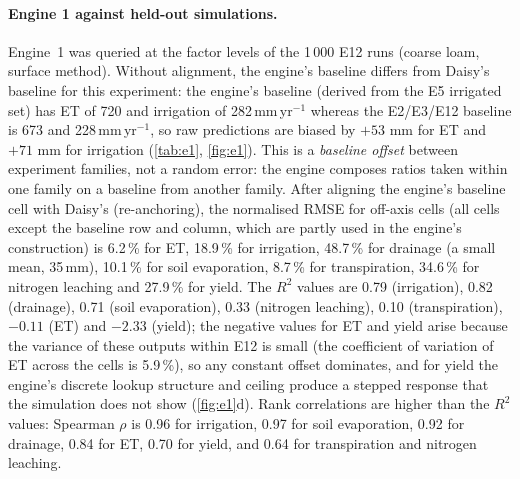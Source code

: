 \documentclass[preprint,12pt]{elsarticle}
\begin{document}
\paragraph{Engine 1 against held-out simulations.}
\label{sec:e1}
Engine~1 was queried at the factor levels of the 1\,000 E12 runs (coarse loam, surface method). Without alignment, the engine's baseline differs from Daisy's baseline for this experiment: the engine's baseline (derived from the E5 irrigated set) has ET of 720 and irrigation of 282\,mm\,yr$^{-1}$ whereas the E2/E3/E12 baseline is 673 and 228\,mm\,yr$^{-1}$, so raw predictions are biased by $+53$ mm for ET and $+71$ mm for irrigation (\cref{tab:e1}, \cref{fig:e1}). This is a \emph{baseline offset} between experiment families, not a random error: the engine composes ratios taken within one family on a baseline from another family. After aligning the engine's baseline cell with Daisy's (re-anchoring), the normalised RMSE for off-axis cells (all cells except the baseline row and column, which are partly used in the engine's construction) is 6.2\,\% for ET, 18.9\,\% for irrigation, 48.7\,\% for drainage (a small mean, 35\,mm), 10.1\,\% for soil evaporation, 8.7\,\% for transpiration, 34.6\,\% for nitrogen leaching and 27.9\,\% for yield. The $R^2$ values are 0.79 (irrigation), 0.82 (drainage), 0.71 (soil evaporation), 0.33 (nitrogen leaching), 0.10 (transpiration), $-0.11$ (ET) and $-2.33$ (yield); the negative values for ET and yield arise because the variance of these outputs within E12 is small (the coefficient of variation of ET across the cells is 5.9\,\%), so any constant offset dominates, and for yield the engine's discrete lookup structure and ceiling produce a stepped response that the simulation does not show (\cref{fig:e1}d). Rank correlations are higher than the $R^2$ values: Spearman $\rho$ is 0.96 for irrigation, 0.97 for soil evaporation, 0.92 for drainage, 0.84 for ET, 0.70 for yield, and 0.64 for transpiration and nitrogen leaching.
\end{document}
